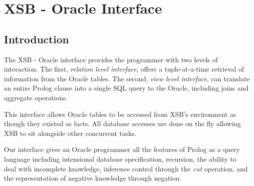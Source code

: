 \chapter{XSB - Oracle Interface} \label{oracle_inter}

\section{Introduction}

The XSB - Oracle interface provides the programmer with two levels of
interaction.  The first, {\it relation level interface},
offers a tuple-at-a-time retrieval of information from the Oracle
tables.  The second, {\it view level interface}, can translate an
entire Prolog clause into a single SQL query to the Oracle, including
joins and aggregate operations.

This interface allows Oracle tables to be accessed from XSB's
environment as though they existed as facts. All database accesses are
done on the fly allowing XSB to sit alongside other concurrent tasks.

Our interface gives an Oracle programmer all the features of Prolog as
a query language including intensional database specification,
recursion, the ability to deal with incomplete knowledge, inference
control through the {\it cut} operation, and the representation of
negative knowledge through negation.


